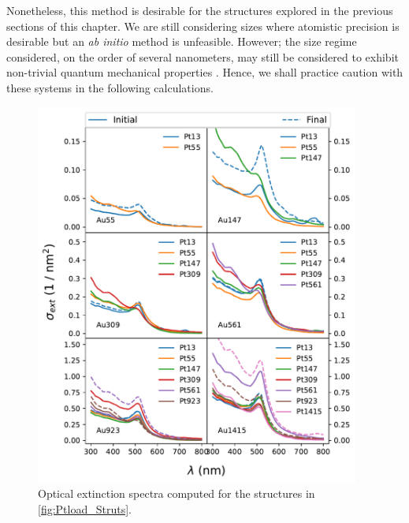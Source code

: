 Nonetheless, this method is desirable for the structures explored in the previous sections of this chapter. We are still considering sizes where atomistic precision is desirable but an \textit{ab initio} method is unfeasible. However; the size regime considered, on the order of several nanometers, may still be considered to exhibit non-trivial quantum mechanical properties \cite{QuantumPlasmonCoupling}. Hence, we shall practice caution with these systems in the following calculations.

\begin{figure}[ht!]
\centering
\includegraphics[width=0.95\textwidth]{figures/MD/Coal/Specs.pdf}
\caption{Optical extinction spectra computed for the structures in \ref{fig:Ptload_Struts}.}
\label{fig:GDM_Ih}
\end{figure}

